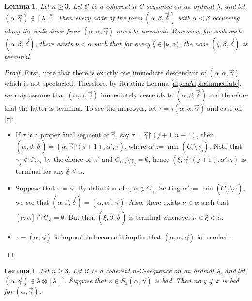 \documentclass{amsart}
\numberwithin{theorem}{section}
\newtheorem{lemma}[theorem]{Lemma}
\theoremstyle{definition}
\newcommand{\restr}{\mathord{\upharpoonright}}
\newcommand{\C}{\mathcal{C}}
\begin{document}
\begin{lemma}\label{nAlphaTerminal}
Let $n\ge 3$. Let $\C$ be a coherent $n$-$C$-sequence on an ordinal $\lambda$, and let
$(\alpha,\vec{\gamma}) \in [\lambda]^n$. Then every node of the form $(\alpha,\beta,\vec\delta)$ with $\alpha<\beta$ occurring along the walk down from $(\alpha,\alpha,\vec\gamma)$ must be terminal. Moreover, for each such $(\alpha,\beta,\vec{\delta})$, there exists $\nu<\alpha$ such that for every $\xi\in [\nu,\alpha)$, the node $(\xi,\beta,\vec\delta)$ is terminal.
\end{lemma}
\begin{proof}
First, note that there is exactly one immediate descendant of $(\alpha,\alpha,\vec\gamma)$ which is not spectacled. Therefore, by iterating Lemma \ref{alphaAlphaimmediate}, we may assume that $(\alpha,\alpha,\vec\gamma)$ immediately descends to $(\alpha,\beta,\vec\delta)$ and therefore that the latter is terminal. To see the moreover, let $\tau=\tau(\alpha,\alpha,\vec\gamma)$ and case on $|\tau|$:
\begin{itemize}
\item If $\tau$ is a proper final segment of $\vec\gamma$, say $\tau=\vec\gamma\restr(j+1,n-1)$, then $(\alpha,\beta,\vec\delta)=(\alpha,\vec\gamma\restr(j+1),\alpha',\tau)$, where $\alpha':=\min(C_\tau\setminus\gamma_j)$. Note that $\gamma_j\not\in C_{\alpha'\tau}$ by the choice of $\alpha'$ and $C_{\alpha'\tau}\setminus \gamma_j=\emptyset$, hence $(\xi,\vec\gamma\restr(j+1),\alpha',\tau)$ is terminal for any $\xi\le\alpha$.
\item Suppose that $\tau=\vec\gamma$. By definition of $\tau$, $\alpha\not\in C_{\vec\gamma}$. Setting $\alpha':=\min(C_{\vec\gamma}\setminus\alpha)$, we see that $(\alpha,\beta,\vec\delta)=(\alpha,\alpha',\vec\gamma)$. Also,
there exists $\nu<\alpha$ such that $[\nu,\alpha]\cap C_{\vec\gamma}=\emptyset$. But then $(\xi,\beta,\vec\delta)$ is terminal whenever $\nu<\xi<\alpha$.
\item $\tau=(\alpha,\vec\gamma)$ is impossible because it implies that $(\alpha,\alpha,\vec\gamma)$ is terminal.\qedhere
\end{itemize}
\end{proof}

\begin{lemma}\label{nbadImmediate}
Let $n\ge 3$. Let $\C$ be a coherent $n$-$C$-sequence on an ordinal $\lambda$, and let 
$(\alpha,\vec{\gamma}) \in \lambda \otimes [\lambda]^n$. Suppose that $x\in S_n(\alpha,\vec\gamma)$ is bad. Then no $y\supsetneq x$ is bad for $(\alpha,\vec{\gamma})$.
\end{lemma}
\end{document}
